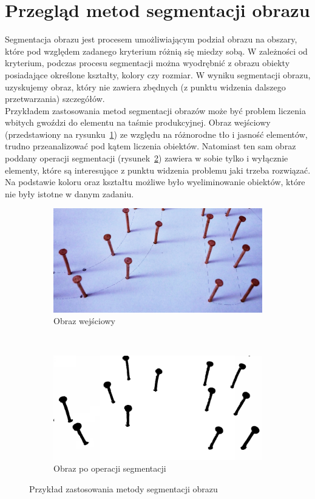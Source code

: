 \section{Przegląd metod segmentacji obrazu}
Segmentacja obrazu jest procesem umożliwiającym podział obrazu na obszary, które pod względem zadanego kryterium różnią się miedzy sobą. W zależności od kryterium, podczas procesu segmentacji można wyodrębnić z obrazu obiekty posiadające określone kształty, kolory czy rozmiar. W wyniku segmentacji obrazu, uzyskujemy obraz, który nie zawiera zbędnych (z punktu widzenia dalszego przetwarzania) szczegółów.\\
Przykładem zastosowania metod segmentacji obrazów może być problem liczenia wbitych gwoździ do elementu na taśmie produkcyjnej. Obraz wejściowy (przedstawiony na rysunku~\ref{fig:gwozdzie_input}) ze względu na różnorodne tło i jasność elementów, trudno przeanalizować pod kątem liczenia obiektów. Natomiast ten sam obraz poddany operacji segmentacji (rysunek~\ref{fig:gwozdzie_output}) zawiera w sobie tylko i wyłącznie elementy, które są interesujące z punktu widzenia problemu jaki trzeba rozwiązać. Na podstawie koloru oraz kształtu możliwe było wyeliminowanie obiektów, które nie były istotne w danym zadaniu.

\begin{figure}
  \centering
  \begin{subfigure}[b]{0.48\textwidth}
    \includegraphics[width=\textwidth]{img/gwozdzie-input}
    \caption{Obraz wejściowy}
    \label{fig:gwozdzie_input}
  \end{subfigure}
  ~
  \begin{subfigure}[b]{0.48\textwidth}
    \includegraphics[width=\textwidth]{img/gwozdzie-output}
    \caption{Obraz po operacji segmentacji}
    \label{fig:gwozdzie_output}
  \end{subfigure}
  \caption{Przykład zastosowania metody segmentacji obrazu}\label{fig:gwozdzie}
\end{figure}

